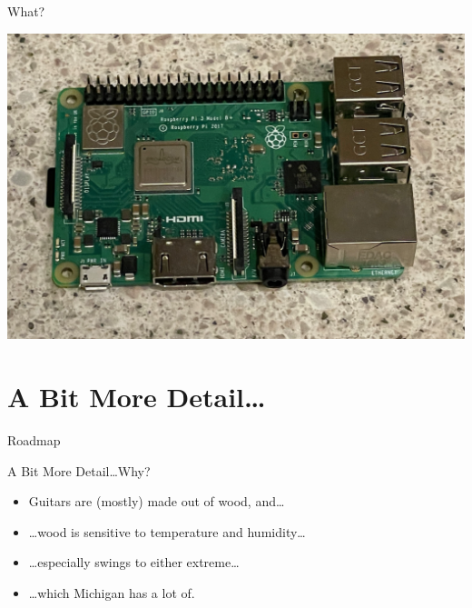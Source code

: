 \documentclass{beamer}
\begin{document}
    \begin{frame}{\sectitle}{What?}
      \begin{center}
        \includegraphics[scale=.20]{images/rpi.png}
      \end{center}
    \end{frame}


  \renewcommand{\sectitle}{A Bit More Detail\dots}
  \section{\sectitle}
  \begin{frame}{Roadmap}
      \tableofcontents[currentsection]
  \end{frame}

  \begin{frame}{\sectitle}{Why?}
    \begin{itemize}\LARGE
      \item Guitars are (mostly) made out of wood, and\dots
      \item \dots wood is sensitive to temperature and humidity\dots
      \item \dots especially swings to either extreme\dots
      \item \dots which Michigan has a lot of.
    \end{itemize}
  \end{frame}
\end{document}
